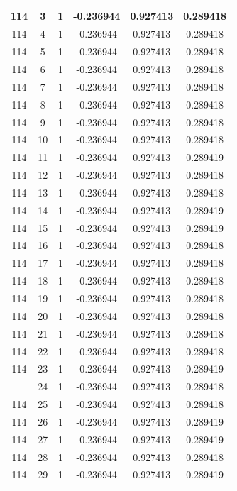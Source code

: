 \documentclass[12pt,a4paper]{article}
\numberwithin{equation}{section}
\numberwithin{figure}{section}
\numberwithin{table}{section}
\begin{document}
\begin{longtable}{|c|c|c|c|c|c|}
114 & 3 & 1 & -0.236944 & 0.927413 & 0.289418 \\ \hline
114 & 4 & 1 & -0.236944 & 0.927413 & 0.289418 \\ \hline
114 & 5 & 1 & -0.236944 & 0.927413 & 0.289418 \\ \hline
114 & 6 & 1 & -0.236944 & 0.927413 & 0.289418 \\ \hline
114 & 7 & 1 & -0.236944 & 0.927413 & 0.289418 \\ \hline
114 & 8 & 1 & -0.236944 & 0.927413 & 0.289418 \\ \hline
114 & 9 & 1 & -0.236944 & 0.927413 & 0.289418 \\ \hline
114 & 10 & 1 & -0.236944 & 0.927413 & 0.289418 \\ \hline
114 & 11 & 1 & -0.236944 & 0.927413 & 0.289419 \\ \hline
114 & 12 & 1 & -0.236944 & 0.927413 & 0.289418 \\ \hline
114 & 13 & 1 & -0.236944 & 0.927413 & 0.289418 \\ \hline
114 & 14 & 1 & -0.236944 & 0.927413 & 0.289419 \\ \hline
114 & 15 & 1 & -0.236944 & 0.927413 & 0.289419 \\ \hline
114 & 16 & 1 & -0.236944 & 0.927413 & 0.289418 \\ \hline
114 & 17 & 1 & -0.236944 & 0.927413 & 0.289418 \\ \hline
114 & 18 & 1 & -0.236944 & 0.927413 & 0.289418 \\ \hline
114 & 19 & 1 & -0.236944 & 0.927413 & 0.289418 \\ \hline
114 & 20 & 1 & -0.236944 & 0.927413 & 0.289418 \\ \hline
114 & 21 & 1 & -0.236944 & 0.927413 & 0.289418 \\ \hline
114 & 22 & 1 & -0.236944 & 0.927413 & 0.289418 \\ \hline
114 & 23 & 1 & -0.236944 & 0.927413 & 0.289419 \\ \hline
\pagebreak
114 & 24 & 1 & -0.236944 & 0.927413 & 0.289418 \\ \hline
114 & 25 & 1 & -0.236944 & 0.927413 & 0.289418 \\ \hline
114 & 26 & 1 & -0.236944 & 0.927413 & 0.289419 \\ \hline
114 & 27 & 1 & -0.236944 & 0.927413 & 0.289419 \\ \hline
114 & 28 & 1 & -0.236944 & 0.927413 & 0.289418 \\ \hline
114 & 29 & 1 & -0.236944 & 0.927413 & 0.289419 \\ \hline

\end{longtable}
\end{document}
